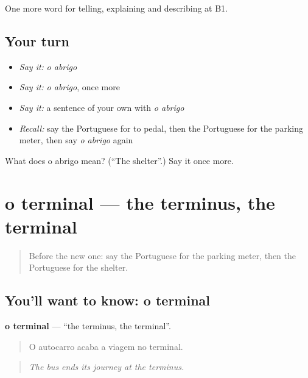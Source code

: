 \begin{grammarlens}[title={What you've built}]
One more word for telling, explaining and describing at B1.
\end{grammarlens}

\subsection*{Your turn}
\begin{itemize}
\raggedright
  \item \emph{Say it:} \emph{o abrigo}
  \item \emph{Say it:} \emph{o abrigo}, once more
  \item \emph{Say it:} a sentence of your own with \emph{o abrigo}
  \item \emph{Recall:} say the Portuguese for to pedal, then the Portuguese for the parking meter, then say \emph{o abrigo} again
\end{itemize}

\begin{tcolorbox}[breakable,colback=teal!4,colframe=teal!35!black,title={Before you move on}]
What does o abrigo mean? (\textquotedblleft{}The shelter\textquotedblright{}.) Say it once more.
\end{tcolorbox}
\section[o terminal]{o terminal — the terminus, the terminal}

\label{lesson:PT-C413-terminal}



\begin{quote}
Before the new one: say the Portuguese for the parking meter, then the Portuguese for the shelter.
\end{quote}

\subsection*{You'll want to know: o terminal}
\textbf{o terminal} — \textquotedblleft{}the terminus, the terminal\textquotedblright{}.

\begin{quote}
O autocarro acaba a viagem no terminal.
\end{quote}

\begin{quote}
\emph{The bus ends its journey at the terminus.}
\end{quote}

